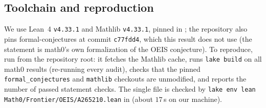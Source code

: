 \documentclass[11pt]{amsart}
\theoremstyle{plain}
\theoremstyle{definition}
\begin{document}
\subsection*{Toolchain and reproduction}
We use Lean~4 \cite{Lean4} \texttt{v4.33.1} and Mathlib \cite{Mathlib} \texttt{v4.33.1}, pinned in ; the repository also pins formal-conjectures \cite{FC} at commit \texttt{c77fdd4}, which this result does not use (the statement is math0's own formalization of the OEIS conjecture).
To reproduce, run  from the repository root: it fetches the Mathlib cache, runs \texttt{lake build} on all math0 results (re-running every audit), checks that the pinned \texttt{formal\_conjectures} and \texttt{mathlib} checkouts are unmodified, and reports the number of passed statement checks. The single file is checked by \texttt{lake env lean Math0/Frontier/OEIS/A265210.lean} in  (about $17$\,s on our machine).
\end{document}
